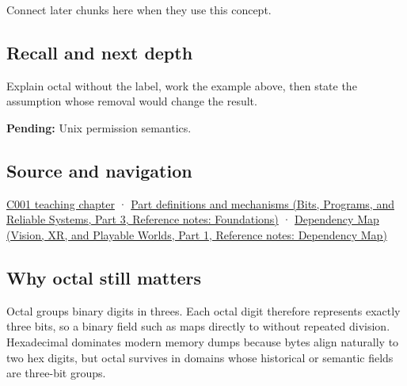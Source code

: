 \hypertarget{appendix-17fc1bc8b305-used-by}{}

Connect later chunks here when they use this concept.

\subsection{Recall and next depth}\label{appendix-17fc1bc8b305-recall-and-next-depth}

\hypertarget{appendix-17fc1bc8b305-recall-and-next-depth}{}

Explain octal without the label, work the example above, then state the assumption whose removal would change the result.

\textbf{Pending:} Unix permission semantics.

\subsection{Source and navigation}\label{appendix-17fc1bc8b305-source-and-navigation}

\hypertarget{appendix-17fc1bc8b305-source-and-navigation}{}

\hyperref[01-foundations-i-ch001-from-a-signal-to-an-interpretation]{C001 teaching chapter} · \href{../01-Bits-Programs-and-Reliable-Systems-P03/main.pdf\#nameddest=appendix-fd090d982a15}{Part definitions and mechanisms (Bits, Programs, and Reliable Systems, Part 3, Reference notes: Foundations)} · \href{../07-Vision-XR-and-Playable-Worlds-P01/main.pdf\#nameddest=appendix-4ad47bdd269a}{Dependency Map (Vision, XR, and Playable Worlds, Part 1, Reference notes: Dependency Map)}

\subsection{Why octal still matters}\label{appendix-17fc1bc8b305-why-octal-still-matters}

\hypertarget{appendix-17fc1bc8b305-why-octal-still-matters}{}

Octal groups binary digits in threes. Each octal digit therefore represents exactly three bits, so a binary field such as  maps directly to  without repeated division. Hexadecimal dominates modern memory dumps because bytes align naturally to two hex digits, but octal survives in domains whose historical or semantic fields are three-bit groups.

